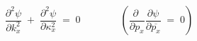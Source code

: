 \begin{equation}
{\frac{\partial^2 \psi}{\partial k^2_x}} \; +\;	
	{\frac{\partial^2 \psi}{\partial \kappa^2_x}}\; = 
		\; 0\qquad\qquad\left( 	{\frac{\partial \;}{\partial p_x}}
	{\frac{\partial \psi}{\partial \overline{p_x}}} \; = \; 0\right) 
\label{eq:holomorphic1} 
\end{equation}

